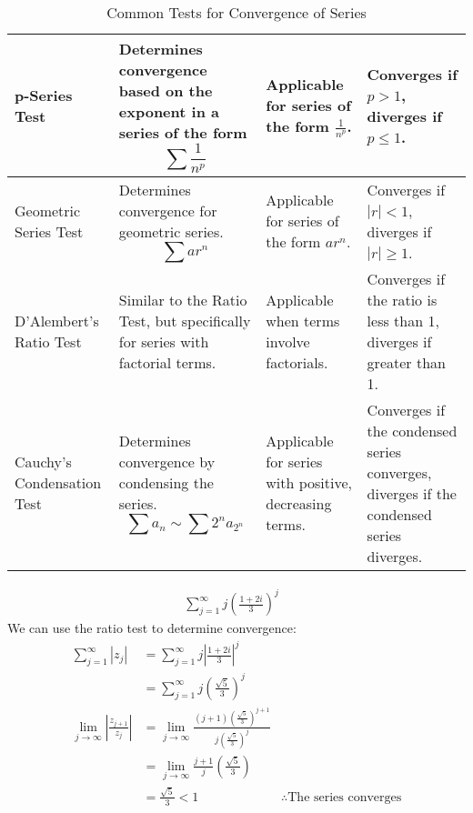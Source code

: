 \begin{table}[htbp]
\begin{tabular}{| m{2cm} | m{5cm} | m{3cm} | m{3cm} |}
        \hline
        p-Series Test              & Determines convergence based on the exponent in a series of the form \[ \sum \frac{1}{n^p} \]         & Applicable for series of the form \(\frac{1}{n^p}\).                      & Converges if \( p > 1 \), diverges if \( p \leq 1 \).                                     \\
        \hline
        Geometric Series Test      & Determines convergence for geometric series. \[ \sum ar^n \]                                          & Applicable for series of the form \(ar^n\).                               & Converges if \( |r| < 1 \), diverges if \( |r| \geq 1 \).                                 \\
        \hline
        D'Alembert's Ratio Test    & Similar to the Ratio Test, but specifically for series with factorial terms.                          & Applicable when terms involve factorials.                                 & Converges if the ratio is less than 1, diverges if greater than 1.                        \\
        \hline
        Cauchy's Condensation Test & Determines convergence by condensing the series. \[ \sum a_n \sim \sum 2^n a_{2^n} \]                 & Applicable for series with positive, decreasing terms.                    & Converges if the condensed series converges, diverges if the condensed series diverges.   \\
        \hline
    \end{tabular}
    \caption{Common Tests for Convergence of Series}
    \label{table:convergence_tests}
\end{table}


\begin{example}
    \begin{align}
        \sum_{j=1}^{\infty} j \left( \frac{1 + 2i}{3} \right)^j &
    \end{align}
    We can use the ratio test to determine convergence:
    \begin{align*}
        \sum_{j=1}^{\infty} \left| z_j \right|                 & = \sum_{j=1}^{\infty} j \left| \frac{1 + 2i}{3} \right|^j                                 \\
                                                               & = \sum_{j=1}^{\infty} j \left( \frac{\sqrt{5}}{3} \right)^j                               \\
        \lim_{j \to \infty} \left| \frac{z_{j+1}}{z_j} \right| & = \lim_{j \to \infty} \frac{(j+1)({\frac{\sqrt{5}}{3}})^{j + 1}}{j(\frac{\sqrt{5}}{3})^j} \\
                                                               & = \lim_{j \to \infty} \frac{j+1}{j} \left( \frac{\sqrt{5}}{3} \right)                     \\
                                                               & = \frac{\sqrt{5}}{3} < 1
                                                               & \therefore \text{The series converges}
    \end{align*}
\end{example}

